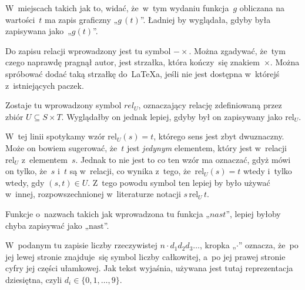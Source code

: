 \documentclass[a4paper,11pt]{article}
\numberwithin{equation}{section}
\newcommand{\rel}{\text{rel}}
\begin{document}
\VerSpaceFour





\noindent
{} W~miejscach takich jak to, widać, że~w~tym wydaniu
funkcja~$g$ obliczana na wartości~$t$ ma zapis graficzny „$g \, ( t )$”.
Ładniej by wyglądała, gdyby była zapisywana jako~„$g( t )$”.

\VerSpaceFour





\noindent
{} Do zapisu relacji wprowadzony jest tu symbol
$- \times$. Można zgadywać, że~tym czego naprawdę pragnął autor, jest strzałka,
która kończy~się znakiem~$\times$. Można spróbować dodać taką strzałkę
do~\LaTeX a, jeśli nie jest dostępna w~którejś z~istniejących paczek.

\VerSpaceFour





\noindent
{} Zostaje tu wprowadzony symbol $rel_{ U }$,
oznaczający relację zdefiniowaną przez zbiór $U \subseteq S \times T$. Wyglądałby on
jednak lepiej, gdyby był on zapisywany jako $\rel_{ U }$.

\VerSpaceFour





\noindent
{} W~tej linii spotykamy wzór $\rel_{ U }( s ) = t$,
którego sens jest zbyt dwuznaczny. Może on bowiem sugerować, że~$t$ jest
\textit{jedynym} elementem, który jest w~relacji $\rel_{ U }$
z~elementem~$s$. Jednak to nie jest to co ten wzór ma oznaczać, gdyż mówi
on tylko, że~$s$ i~$t$ są w~relacji, co wynika z~tego,
że~$\rel_{ U }( s ) = t$ wtedy i~tylko wtedy, gdy $( s, t ) \in U$. Z~tego
powodu symbol ten lepiej by było używać w~innej, rozpowszechnionej
w~literaturze notacji $s \, \rel_{ U } \, t$.

\VerSpaceFour





\noindent
{} Funkcje o~nazwach takich jak wprowadzona tu funkcja
„$nast$”, lepiej byłoby chyba zapisywać jako „$\text{nast}$”.

\VerSpaceFour





\noindent
{} W~podanym tu zapisie liczby rzeczywistej
$n \cdot d_{ 1 } d_{ 2 } d_{ 3 }\ldots$, kropka „$\cdot$” oznacza, że~po jej lewej stronie
znajduje~się symbol liczby całkowitej, a~po jej prawej stronie cyfry
jej części ułamkowej. Jak tekst wyjaśnia, używana jest tutaj reprezentacja
dziesiętna, czyli $d_{ i } \in \{ 0, 1, \ldots, 9 \}$.
\end{document}

